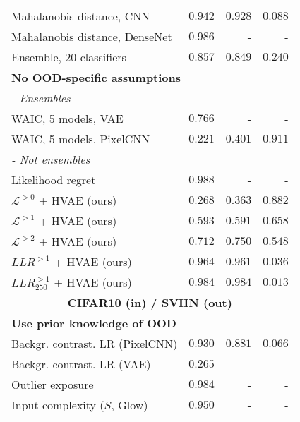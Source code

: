 {\begin{table}[t!]
{\begin{tabular}{lrrr}
Mahalanobis distance, CNN {\cite{ren_likelihood_2019}}                     & $0.942$ & $0.928$ & $0.088$ \\
Mahalanobis distance, DenseNet {\cite{lee_simple_2018}}                & $0.986$ & - & - \\
Ensemble, 20 classiﬁers {\cite{ren_likelihood_2019, lakshminarayanan_simple_2017}}                  & $0.857$ & $0.849$ & $0.240$ \\
         \multicolumn{4}{l}{\textbf{No OOD-specific assumptions}} \\
         \multicolumn{4}{l}{\textit{- Ensembles}} \\
WAIC, 5 models, VAE {\cite{choi_waic_2019}}                          & $0.766$ & - & - \\
WAIC, 5 models, PixelCNN {\cite{ren_likelihood_2019}}                      & $0.221$ & $0.401$ & $0.911$ \\
        \multicolumn{4}{l}{\textit{- Not ensembles}} \\
Likelihood regret \cite{xiao_likelihood_2020}                               & $\mathbf{0.988}$ & - & - \\
$\mathcal{L}^{>0}$ + HVAE (ours)                    & $0.268$ & $0.363$ & $0.882$ \\
$\mathcal{L}^{>1}$ + HVAE (ours)                    & $0.593$ & $0.591$ & $0.658$ \\
$\mathcal{L}^{>2}$ + HVAE (ours)                    & $0.712$ & $0.750$ & $0.548$ \\
$LLR^{>1}$ + HVAE (ours)                            & $0.964$ & $0.961$ & $0.036$ \\
$LLR^{>1}_{250}$ + HVAE (ours)                      & $0.984$ & $\mathbf{0.984}$ & $\mathbf{0.013}$ \\
         \midrule
         \multicolumn{4}{c}{\textbf{CIFAR10 (in) / SVHN (out)}} \\
         \midrule
         \multicolumn{4}{l}{\textbf{Use prior knowledge of OOD}} \\
Backgr. contrast. LR (PixelCNN) {\cite{ren_likelihood_2019}}               & $0.930$ & $0.881$ & $0.066$ \\
Backgr. contrast. LR (VAE) {\cite{xiao_likelihood_2020}}                    & $0.265$ & - & - \\
Outlier exposure {\cite{hendrycks_deep_2019}}                              & $0.984$ & - & - \\
Input complexity ($S$, Glow) \cite{serra_input_2020}                   & $0.950$ & - & - \\

\end{tabular}}
\end{table}}
